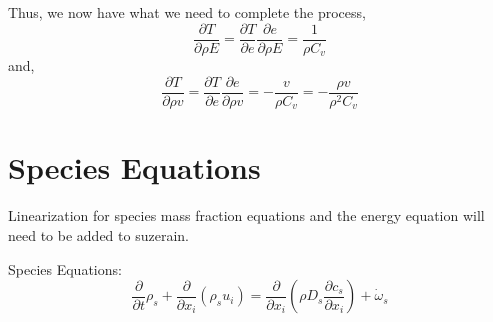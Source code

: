 \documentclass[10pt]{article}
\newcommand{\myred}[1]{{\color{red} #1}}
\begin{document}
Thus, we now have what we need to complete the process,  
\begin{equation}
\frac{\partial T}{\partial \rho E}  = \frac{\partial T}{\partial e}
 \frac{\partial e}{\partial \rho E} = \frac{1}{\rho C_v} 
\end{equation}
and,
\begin{equation}
\frac{\partial T}{\partial \rho v}  = \frac{\partial T}{\partial e}
 \frac{\partial e}{\partial \rho v} = -\frac{v}{\rho C_v} = -\frac{\rho v}{\rho^2 C_v}
\end{equation}


%
% 
%



\section{Species Equations}

Linearization for species mass fraction equations and the
energy equation will need to be added to suzerain. 

Species Equations:
\begin{equation}
 \frac{\partial}{\partial t} \rho_s + \frac{\partial}{\partial
  x_i}\left(\rho_s u_i\right) = \frac{\partial}{\partial x_i}\left(\rho D_s
  \frac{\partial c_s}{\partial x_i} \right) + \dot \omega_s
\end{equation}
\end{document}
